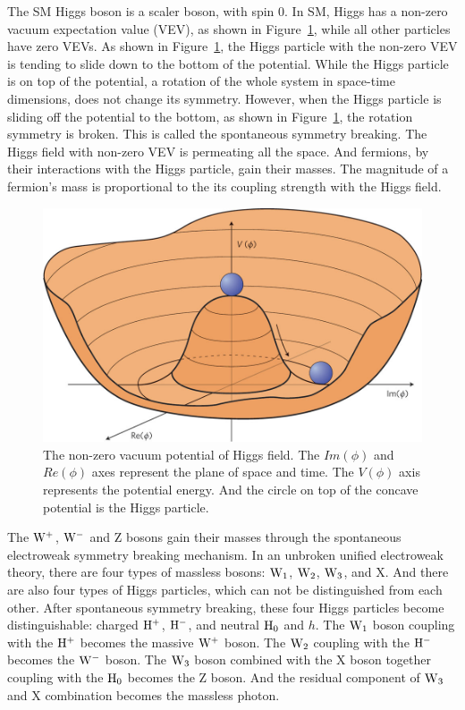 The SM Higgs boson is a scaler boson, with spin 0. In SM, Higgs has a non-zero vacuum expectation
value (VEV), as shown in Figure~\ref{fig:Higgs}, while all other particles have zero VEVs. 
As shown in Figure~\ref{fig:Higgs}, the Higgs particle with the non-zero VEV is tending to slide down to the bottom of the potential. While the Higgs particle is on top of the potential, a rotation of the whole system in space-time dimensions, does not change its symmetry. However, when the Higgs particle is sliding off the potential to the bottom, as shown in Figure~\ref{fig:Higgs}, the rotation symmetry is broken. This is called the spontaneous symmetry breaking.  
The Higgs field with non-zero VEV is permeating all the space. And fermions, by their interactions with the Higgs particle, gain their masses. The magnitude of a fermion's mass is proportional to the its coupling strength with the Higgs field.

\begin{figure}[!htbp]
\centering
\includegraphics[width=.7\textwidth]{figures/Higgs-potential.jpg}
\caption{The non-zero vacuum potential of Higgs field. The $Im(\phi)$ and $Re(\phi)$ axes represent
the plane of space and time. The $V(\phi)$ axis represents the potential energy. And the circle
on top of the concave potential is the Higgs particle.}
\label{fig:Higgs}
\end{figure}  


The ${\rm W^+}$, ${\rm W^-}$ and Z bosons gain their masses through the spontaneous electroweak symmetry breaking mechanism.
In an unbroken unified electroweak theory, there are four types of massless bosons: ${\rm W_1}$,
${\rm W_2}$, ${\rm W_3}$, and X. And there are also four types of Higgs particles, which can not be distinguished from each other. After spontaneous symmetry breaking, these four Higgs particles become distinguishable: charged ${\rm H^+}$, ${\rm H^-}$, and neutral ${\rm H_0}$ and $h$. 
The ${\rm W_1}$ boson coupling with the ${\rm H^+}$ becomes the massive ${\rm W^+}$ boson.
The ${\rm W_2}$ coupling
with the ${\rm H^-}$ becomes the ${\rm W^-}$ boson.
The ${\rm W_3}$ boson combined with the X boson together coupling with the ${\rm H_0}$ becomes the Z boson. And the residual component of ${\rm W_3}$ and X combination becomes the massless photon. 


